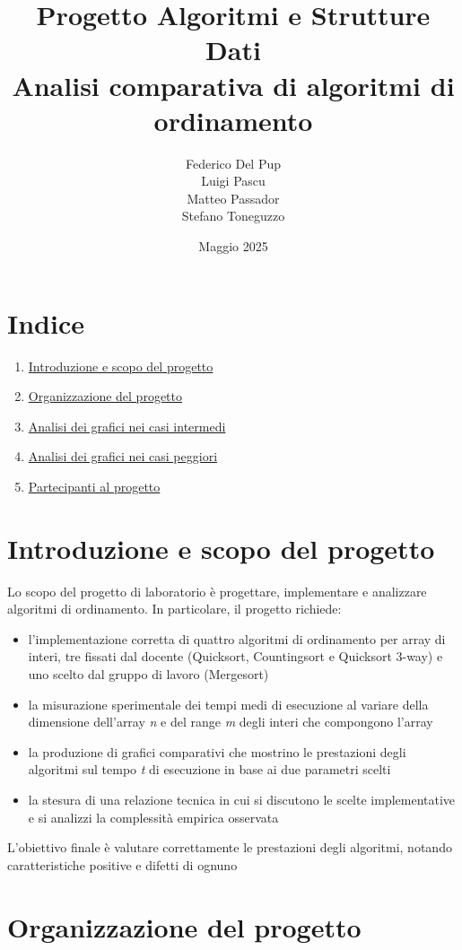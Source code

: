 \documentclass{article}
\title{Progetto Algoritmi e Strutture Dati \\ \large Analisi comparativa di algoritmi di ordinamento}
\author{Federico Del Pup \\
Luigi Pascu \\
Matteo Passador \\
Stefano Toneguzzo
}
\date{Maggio 2025}
\begin{document}
\maketitle

\section*{Indice}
\begin{enumerate}
\item \hyperref[sec:intro]{Introduzione e scopo del progetto}
\item \hyperref[sec:ling]{Organizzazione del progetto}
\item \hyperref[sec:grafici]{Analisi dei grafici nei casi intermedi}
\item \hyperref[sec:peggiori]{Analisi dei grafici nei casi peggiori}
\item \hyperref[sec:partecipanti]{Partecipanti al progetto}
\end{enumerate}

\label{sec:intro}

\section{Introduzione e scopo del progetto}
Lo scopo del progetto di laboratorio è progettare, implementare e analizzare algoritmi di ordinamento. In particolare, il progetto richiede:
\begin{itemize}
\item l’implementazione corretta di quattro algoritmi di ordinamento per array di interi, tre fissati dal docente (Quicksort, Countingsort e Quicksort 3-way) e uno scelto dal gruppo di lavoro (Mergesort)
\item la misurazione sperimentale dei tempi medi di esecuzione al variare della dimensione dell’array \emph{n} e del range \emph{m} degli interi che compongono l'array 
\item la produzione di grafici comparativi che mostrino le prestazioni degli algoritmi sul tempo \emph{t} di esecuzione in base ai due parametri scelti
\item la stesura di una relazione tecnica in cui si discutono le scelte implementative e si analizzi la complessità empirica osservata
\end{itemize}
L'obiettivo finale è valutare correttamente le prestazioni degli algoritmi, notando caratteristiche positive e difetti di ognuno

\label{sec:ling}
\section{Organizzazione del progetto}
\end{document}
